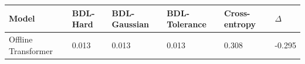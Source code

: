 \begin{tabular}{llllll}
\toprule
Model & BDL-Hard & BDL-Gaussian & BDL-Tolerance & Cross-entropy & $\Delta$ \\
\midrule
Offline Transformer & 0.013 & 0.013 & 0.013 & 0.308 & -0.295 \\
\bottomrule
\end{tabular}
